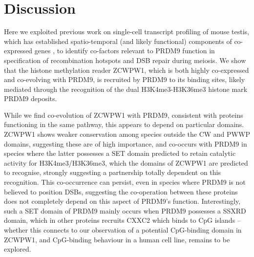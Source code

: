 \section{Discussion}
Here we exploited previous work on single-cell transcript profiling of mouse testis, which has established spatio-temporal (and likely functional) components of co-expressed genes \parencite{Jung2019Unified}, to identify co-factors relevant to PRDM9 function in specification of recombination hotspots and DSB repair during meiosis. We show that the histone methylation reader ZCWPW1, which is both highly co-expressed and co-evolving with PRDM9, is recruited by PRDM9 to its binding sites, likely mediated through the recognition of the dual H3K4me3-H3K36me3 histone mark PRDM9 deposits. 

While we find co-evolution of ZCWPW1 with PRDM9, consistent with proteins functioning in the same pathway, this appears to depend on particular domains. ZCWPW1 shows weaker conservation among species outside the CW and PWWP domains, suggesting these are of high importance, and co-occurs with PRDM9 in species where the latter possesses a SET domain predicted to retain catalytic activity for H3K4me3/H3K36me3, which the domains of ZCWPW1 are predicted to recognise, strongly suggesting a partnership totally dependent on this recognition. This co-occurrence can persist, even in species where PRDM9 is not believed to position DSBs, suggesting the co-operation between these proteins does not completely depend on this aspect of PRDM9’s function. Interestingly, such a SET domain of PRDM9 mainly occurs when PRDM9 possesses a SSXRD domain, which in other proteins \parencite{Banito2018SS18SSX} recruits CXXC2 which binds to CpG islands – whether this connects to our observation of a potential CpG-binding domain in ZCWPW1, and CpG-binding behaviour in a human cell line, remains to be explored.

